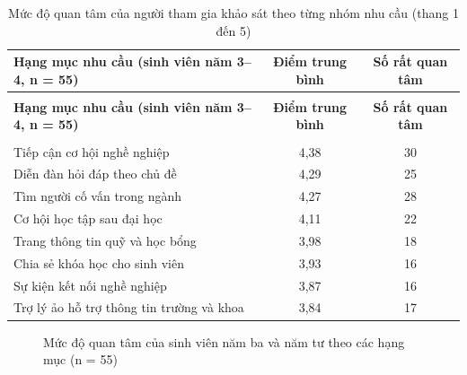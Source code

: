 \documentclass[12pt,a4paper,oneside]{report}
\begin{document}
\renewcommand{\arraystretch}{1.25}
{\small
\begin{longtable}{|>{\raggedright\arraybackslash}p{7.4cm}|c|c|}
\caption{Mức độ quan tâm của người tham gia khảo sát theo từng nhóm nhu cầu (thang 1 đến 5)}\label{tab:survey}\\
\hline \textbf{Hạng mục nhu cầu (sinh viên năm 3--4, n = 55)} & \textbf{Điểm trung bình} & \textbf{Số rất quan tâm} \\ \hline
\endfirsthead
\multicolumn{3}{l}{\itshape\small (tiếp theo trang trước)}\\[2pt]
\hline \textbf{Hạng mục nhu cầu (sinh viên năm 3--4, n = 55)} & \textbf{Điểm trung bình} & \textbf{Số rất quan tâm} \\ \hline
\endhead
\hline \multicolumn{3}{r}{\itshape\small (còn tiếp)}\\
\endfoot
\hline
\endlastfoot
Tiếp cận cơ hội nghề nghiệp & 4,38 & 30 \\ \hline
Diễn đàn hỏi đáp theo chủ đề & 4,29 & 25 \\ \hline
Tìm người cố vấn trong ngành & 4,27 & 28 \\ \hline
Cơ hội học tập sau đại học & 4,11 & 22 \\ \hline
Trang thông tin quỹ và học bổng & 3,98 & 18 \\ \hline
Chia sẻ khóa học cho sinh viên & 3,93 & 16 \\ \hline
Sự kiện kết nối nghề nghiệp & 3,87 & 16 \\ \hline
Trợ lý ảo hỗ trợ thông tin trường và khoa & 3,84 & 17 \\ \hline
\end{longtable}
}
\renewcommand{\arraystretch}{1}

\begin{figure}[htbp]\centering
{}
\caption{Mức độ quan tâm của sinh viên năm ba và năm tư theo các hạng mục (n = 55)}
\label{fig:surveychart}
\end{figure}
\end{document}
